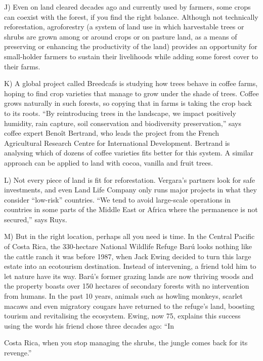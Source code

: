 \documentclass[UTF8,11pt]{ctexart}
\begin{document}
J) Even on land cleared decades ago and currently used by farmers, some crops can coexist with the forest, if you find the right balance. Although not technically reforestation, agroforestry (a system of land use in which harvestable trees or shrubs are grown among or around crops or on pasture land, as a means of preserving or enhancing the productivity of the land) provides an opportunity for small-holder farmers to sustain their livelihoods while adding some forest cover to their farms.


K) A global project called Breedcafs is studying how trees behave in coffee farms, hoping to find crop varieties that manage to grow under the shade of trees. Coffee grows naturally in such forests, so copying that in farms is taking the crop back to its roots. “By reintroducing trees in the landscape, we impact positively humidity, rain capture, soil conservation and biodiversity preservation,” says coffee expert Benoît Bertrand, who leads the project from the French Agricultural Research Centre for International Development. Bertrand is analysing which of dozens of coffee varieties fits better for this system. A similar approach can be applied to land with cocoa, vanilla and fruit trees.


L) Not every piece of land is fit for reforestation. Vergara’s partners look for safe investments, and even Land Life Company only runs major projects in what they consider “low-risk” countries. “We tend to avoid large-scale operations in countries in some parts of the Middle East or Africa where the permanence is not secured,” says Ruys.


M) But in the right location, perhaps all you need is time. In the Central Pacific of Costa Rica, the 330-hectare National Wildlife Refuge Barú looks nothing like the cattle ranch it was before 1987, when Jack Ewing decided to turn this large estate into an ecotourism destination. Instead of intervening, a friend told him to let nature have its way. Barú’s former grazing lands are now thriving woods and the property boasts over 150 hectares of secondary forests with no intervention from humans. In the past 10 years, animals such as howling monkeys, scarlet macaws and even migratory cougars have returned to the refuge’s land, boosting tourism and revitalising the ecosystem. Ewing, now 75, explains this success using the words his friend chose three decades ago: “In


Costa Rica, when you stop managing the shrubs, the jungle comes back for its revenge.”
\end{document}
